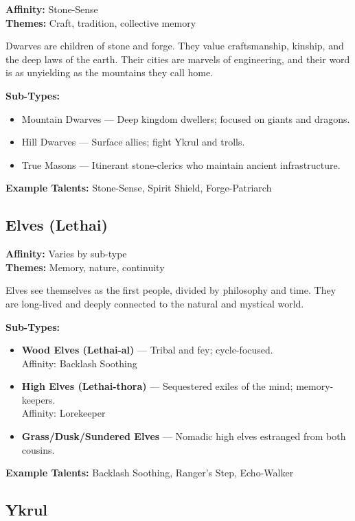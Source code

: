 \textbf{Affinity:} Stone-Sense \\
\textbf{Themes:} Craft, tradition, collective memory

Dwarves are children of stone and forge. They value craftsmanship, kinship, and the deep laws of the earth. Their cities are marvels of engineering, and their word is as unyielding as the mountains they call home.

\textbf{Sub-Types:}
\begin{itemize}
  \item Mountain Dwarves — Deep kingdom dwellers; focused on giants and dragons.
  \item Hill Dwarves — Surface allies; fight Ykrul and trolls.
  \item True Masons — Itinerant stone-clerics who maintain ancient infrastructure.
\end{itemize}

\textbf{Example Talents:} Stone-Sense, Spirit Shield, Forge-Patriarch

\subsection*{Elves (Lethai)}

\textbf{Affinity:} Varies by sub-type \\
\textbf{Themes:} Memory, nature, continuity

Elves see themselves as the first people, divided by philosophy and time. They are long-lived and deeply connected to the natural and mystical world.

\textbf{Sub-Types:}
\begin{itemize}
  \item \textbf{Wood Elves (Lethai-al)} — Tribal and fey; cycle-focused. \\
    Affinity: Backlash Soothing
  \item \textbf{High Elves (Lethai-thora)} — Sequestered exiles of the mind; memory-keepers. \\
    Affinity: Lorekeeper
  \item \textbf{Grass/Dusk/Sundered Elves} — Nomadic high elves estranged from both cousins.
\end{itemize}

\textbf{Example Talents:} Backlash Soothing, Ranger's Step, Echo-Walker

\subsection*{Ykrul}

